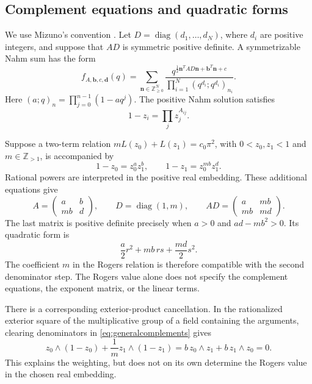 \documentclass[11pt,reqno]{amsart}
\theoremstyle{remark}
\numberwithin{equation}{section}
\newcommand{\ZZ}{\mathbb Z}
\begin{document}
\subsection{Complement equations and quadratic forms}
We use Mizuno's convention \cite{Mizuno}. Let
$D=\operatorname{diag}(d_1,\ldots,d_N)$,
where $d_i$ are positive integers, and suppose that $AD$ is symmetric
positive definite. A symmetrizable Nahm sum has the form
\begin{equation}\label{eq:nahmsum}
 f_{A,\mathbf b,c,\mathbf d}(q)=
 \sum_{\mathbf n\in\ZZ_{\geq0}^N}
 \frac{q^{\frac12\mathbf n^TAD\mathbf n+\mathbf b^T\mathbf n+c}}
 {\prod_{i=1}^N(q^{d_i};q^{d_i})_{n_i}}.
\end{equation}
Here $(a;q)_n=\prod_{j=0}^{n-1}(1-aq^j)$. The positive Nahm solution
satisfies
\begin{equation}\label{eq:nahmequations}
 1-z_i=\prod_j z_j^{A_{ij}}.
\end{equation}

Suppose a two-term relation $mL(z_0)+L(z_1)=c_0\pi^2$, with
$0<z_0,z_1<1$ and $m\in\ZZ_{>1}$, is accompanied by
\begin{equation}\label{eq:generalcomplements}
 1-z_0=z_0^a z_1^b,\qquad 1-z_1=z_0^{mb}z_1^d.
\end{equation}
Rational powers are interpreted in the positive real embedding. These
additional equations give
\begin{equation}\label{eq:generalmatrix}
 A=\begin{pmatrix}a&b\\mb&d\end{pmatrix},\qquad
 D=\operatorname{diag}(1,m),\qquad
 AD=\begin{pmatrix}a&mb\\mb&md\end{pmatrix}.
\end{equation}
The last matrix is positive definite precisely when $a>0$ and
$ad-mb^2>0$. Its quadratic form is
\[
 \frac a2 r^2+mb\,rs+\frac{md}{2}s^2.
\]
The coefficient $m$ in the Rogers relation is therefore compatible with the
second denominator step. The Rogers value alone does not specify the
complement equations, the exponent matrix, or the linear terms.

There is a corresponding exterior-product cancellation. In the rationalized
exterior square of the multiplicative group of a field containing the
arguments, clearing denominators in \eqref{eq:generalcomplements} gives
\[
 z_0\wedge(1-z_0)+\frac1m z_1\wedge(1-z_1)
 =b\,z_0\wedge z_1+b\,z_1\wedge z_0=0.
\]
This explains the weighting, but does not on its own determine the Rogers
value in the chosen real embedding.
\end{document}
